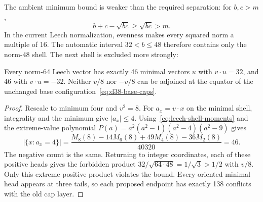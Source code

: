 The ambient minimum bound is weaker than the required separation:
for $b,c>m$,
\[
 b+c-\sqrt{bc}\ge\sqrt{bc}>m.
\]
In the current Leech normalization, evenness makes every squared norm
a multiple of 16. The automatic interval $32<b\le48$ therefore contains
only the norm-48 shell. The next shell is excluded more strongly:

\begin{proposition}\label{prop:no-norm64}
Every norm-64 Leech vector has exactly 46 minimal vectors $u$ with
$v\cdot u=32$, and 46 with $v\cdot u=-32$.
Neither $v/8$ nor $-v/8$ can be adjoined at the equator of the
unchanged base configuration~\eqref{eq:d38-base-caps}.
\end{proposition}
\begin{proof}
Rescale to minimum four and $v^2=8$. For $a_x=v\cdot x$ on the
minimal shell, integrality and the minimum give $|a_x|\le4$.
Using~\eqref{eq:leech-shell-moments} and the extreme-value polynomial
$P(a)=a^2(a^2-1)(a^2-4)(a^2-9)$ gives
\[
 |\{x:a_x=4\}|=
 \frac{M_8(8)-14M_6(8)+49M_4(8)-36M_2(8)}{40320}=46.
\]
The negative count is the same. Returning to integer coordinates,
each of these positive heads gives the forbidden product
$32/\sqrt{64\cdot48}=1/\sqrt3>1/2$ with $v/8$.
Only this extreme positive product violates the bound. Every oriented
minimal head appears at three tails, so each proposed endpoint has
exactly 138 conflicts with the old cap layer.
\end{proof}

